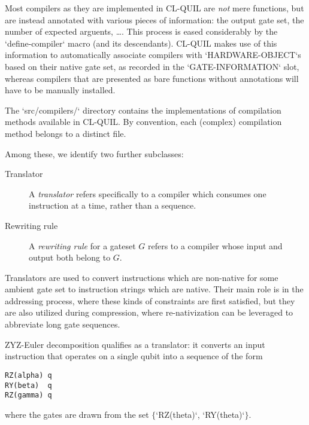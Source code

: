 \begin{remark}
Most compilers as they are implemented in CL-QUIL are \emph{not} mere functions, but are instead annotated with various pieces of information: the output gate set, the number of expected arguents, \ldots .  This process is eased considerably by the `define-compiler` macro (and its descendants).  CL-QUIL makes use of this information to automatically associate compilers with `HARDWARE-OBJECT`s based on their native gate set, as recorded in the `GATE-INFORMATION` slot, whereas compilers that are presented as bare functions without annotations will have to be manually installed.
\end{remark}

\begin{remark}
The `src/compilers/` directory contains the implementations of compilation methods available in CL-QUIL.  By convention, each (complex) compilation method belongs to a distinct file.
\end{remark}





Among these, we identify two further subclasses:

\begin{description}
\item[Translator] A \textit{translator} refers specifically to a compiler which consumes one instruction at a time, rather than a sequence.
\item[Rewriting rule] A \textit{rewriting rule} for a gateset $G$ refers to a compiler whose input and output both belong to $G$.
\end{description}

Translators are used to convert instructions which are non-native for some ambient gate set to instruction strings which are native.  Their main role is in the addressing process, where these kinds of constraints are first satisfied, but they are also utilized during compression, where re-nativization can be leveraged to abbreviate long gate sequences.

\begin{example}
ZYZ-Euler decomposition qualifies as a translator: it converts an input instruction that operates on a single qubit into a sequence of the form
\begin{verbatim}
RZ(alpha) q
RY(beta)  q
RZ(gamma) q
\end{verbatim}
where the gates are drawn from the set $\{$`RZ(theta)`, `RY(theta)`$\}$.
\end{example}

